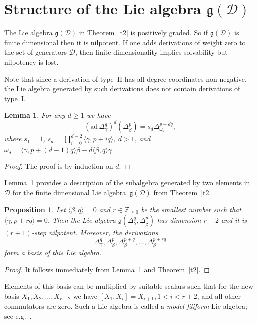 \documentclass[a4paper, 12pt,oneside,reqno]{amsart}
\numberwithin{equation}{section}
\newtheorem{lemma}[theorem]{Lemma}
\newtheorem{proposition}[theorem]{Proposition}
\theoremstyle{definition}
\begin{document}
{\section{Structure of the Lie algebra $\mathfrak{g}(\mathcal{D})$}
\label{s3-2}

The Lie algebra $\mathfrak{g}(\mathcal{D})$ in Theorem~\ref{t2} is positively graded. So if $\mathfrak{g}(\mathcal{D})$ is finite dimensional then it is nilpotent. If one adds derivations of weight zero to the set of generators $\mathcal{D}$, then finite dimensionality implies solvability but nilpotency is lost. 

Note that since a derivation of type~II has all degree coordinates non-negative, the Lie algebra generated by such derivations does not contain derivations of type~I. 

\begin{lemma}
\label{l36}
For any $d\ge 1$ we have
$$
(\mathrm{ad}\,\Delta^q_{\gamma})^d(\Delta^p_{\beta})=s_d\Delta^{p+dq}_{\omega_d}, 
$$
where $s_1=1$, $s_d=\prod_{i=0}^{d-2}\langle\gamma,p+iq\rangle$, $d>1$, and $\omega_d=\langle\gamma,p+(d-1)q\rangle\beta-d\langle\beta,q\rangle\gamma$. 
\end{lemma} 
\begin{proof}
The proof is by induction on $d$.
\end{proof}

Lemma~\ref{l36} provides a description of the subalgebra generated by two elements in $\mathcal{D}$ for the finite dimensional Lie algebra~$\mathfrak{g}(\mathcal{D})$ from Theorem~\ref{t2}. 

\begin{proposition}
Let $\langle\beta, q\rangle=0$ and $r\in\mathbb{Z}_{\ge 0}$ be the smallest number such that $\langle\gamma, p+rq\rangle=0$. Then the Lie algebra $\mathfrak{g}(\Delta^q_{\gamma}, \Delta^p_{\beta})$ has dimension $r+2$ and it is $(r+1)$-step nilpotent. Moreover, the derivations 
$$
\Delta^q_{\gamma}, \Delta^p_{\beta}, \Delta^{p+q}_{\beta},\ldots,\Delta^{p+rq}_{\beta}
$$
form a basis of this Lie algebra. 
\end{proposition} 

\begin{proof}
It follows immediately from Lemma~\ref{l36} and Theorem~\ref{t2}. 
\end{proof}

Elements of this basis can be multiplied by suitable scalars such that for the new basis $X_1,X_2,\ldots,X_{r+2}$ we have
$[X_1,X_i]=X_{i+1}, 1<i<r+2$, and all other commutators are zero. Such a Lie algebra is called a \emph{model filiform} Lie algebra; see e.g.~\cite{GKh}. 

}
\end{document}
